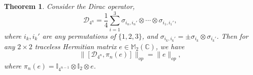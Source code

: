 \documentclass[10pt,a4paper]{amsart}
\newtheorem{theorem}{Theorem}
\begin{document}
\begin{theorem}
  Consider the Dirac operator,
  \begin{equation}
    \mathcal{D}_{4^n} = \frac{1}{4}  \sum_{i = 1}^3 \sigma_{i_n, i_n'}
    \otimes \cdots \otimes \sigma_{i_1, i_1'},
  \end{equation}
  where $i_k, i_k'$ are any permutations of $\{1, 2, 3\}$, and $\sigma_{i_k,
  i_k'} = \pm \sigma_{i_k} \otimes \sigma_{i_k'}$. Then for any $2 \times 2$
  traceless Hermitian matrix $e \in \mathbb{M}_2 (\mathbb{C})$, we have
  \begin{equation}
    \|[\mathcal{D}_{4^n}, \pi_n (e)]\|_{op} = \|e\|_{op},
  \end{equation}
  where $\pi_n (e) =\mathbb{I}_{4^{n - 1}} \otimes \mathbb{I}_2 \otimes e$.
\end{theorem}
\end{document}
